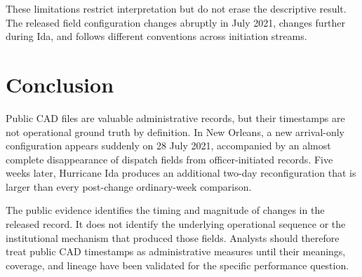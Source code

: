 \documentclass[11pt]{article}
\begin{document}
These limitations restrict interpretation but do not erase the descriptive result. The released field configuration changes abruptly in July 2021, changes further during Ida, and follows different conventions across initiation streams.

\section{Conclusion}

Public CAD files are valuable administrative records, but their timestamps are not operational ground truth by definition. In New Orleans, a new arrival-only configuration appears suddenly on 28 July 2021, accompanied by an almost complete disappearance of dispatch fields from officer-initiated records. Five weeks later, Hurricane Ida produces an additional two-day reconfiguration that is larger than every post-change ordinary-week comparison.

The public evidence identifies the timing and magnitude of changes in the released record. It does not identify the underlying operational sequence or the institutional mechanism that produced those fields. Analysts should therefore treat public CAD timestamps as administrative measures until their meanings, coverage, and lineage have been validated for the specific performance question.



\end{document}
